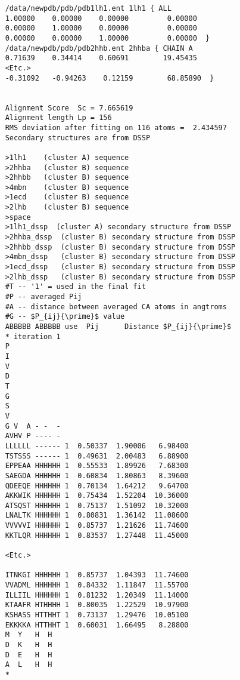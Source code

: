     \begin{scriptsize}\begin{verbatim}
    /data/newpdb/pdb/pdb1lh1.ent 1lh1 { ALL 
    1.00000    0.00000    0.00000         0.00000 
    0.00000    1.00000    0.00000         0.00000 
    0.00000    0.00000    1.00000         0.00000  }
    /data/newpdb/pdb/pdb2hhb.ent 2hhba { CHAIN A 
    0.71639    0.34414    0.60691        19.45435 
    <Etc.>
    -0.31092   -0.94263    0.12159        68.85890  }


    Alignment Score  Sc = 7.665619
    Alignment length Lp = 156
    RMS deviation after fitting on 116 atoms =  2.434597
    Secondary structures are from DSSP

    >1lh1    (cluster A) sequence
    >2hhba   (cluster B) sequence
    >2hhbb   (cluster B) sequence
    >4mbn    (cluster B) sequence
    >1ecd    (cluster B) sequence
    >2lhb    (cluster B) sequence
    >space 
    >1lh1_dssp  (cluster A) secondary structure from DSSP
    >2hhba_dssp  (cluster B) secondary structure from DSSP
    >2hhbb_dssp  (cluster B) secondary structure from DSSP
    >4mbn_dssp   (cluster B) secondary structure from DSSP
    >1ecd_dssp   (cluster B) secondary structure from DSSP
    >2lhb_dssp   (cluster B) secondary structure from DSSP
    #T -- '1' = used in the final fit
    #P -- averaged Pij
    #A -- distance between averaged CA atoms in angtroms
    #G -- $P_{ij}{\prime}$ value
    ABBBBB ABBBBB use  Pij      Distance $P_{ij}{\prime}$
    * iteration 1
    P
    I
    V
    D
    T
    G
    S
    V
    G V  A - -  - 
    AVHV P ---- - 
    LLLLLL ------ 1  0.50337  1.90006   6.98400 
    TSTSSS ------ 1  0.49631  2.00483   6.88900 
    EPPEAA HHHHHH 1  0.55533  1.89926   7.68300 
    SAEGDA HHHHHH 1  0.60834  1.80863   8.39600 
    QDEEQE HHHHHH 1  0.70134  1.64212   9.64700 
    AKKWIK HHHHHH 1  0.75434  1.52204  10.36000 
    ATSQST HHHHHH 1  0.75137  1.51092  10.32000 
    LNALTK HHHHHH 1  0.80831  1.36142  11.08600 
    VVVVVI HHHHHH 1  0.85737  1.21626  11.74600 
    KKTLQR HHHHHH 1  0.83537  1.27448  11.45000 

    <Etc.>

    ITNKGI HHHHHH 1  0.85737  1.04393  11.74600 
    VVADML HHHHHH 1  0.84332  1.11847  11.55700 
    ILLIIL HHHHHH 1  0.81232  1.20349  11.14000 
    KTAAFR HTHHHH 1  0.80035  1.22529  10.97900 
    KSHASS HTTHHT 1  0.73137  1.29476  10.05100 
    EKKKKA HTTHHT 1  0.60031  1.66495   8.28800 
    M  Y   H  H   
    D  K   H  H   
    D  E   H  H   
    A  L   H  H   
    *
    \end{verbatim} \end{scriptsize}

